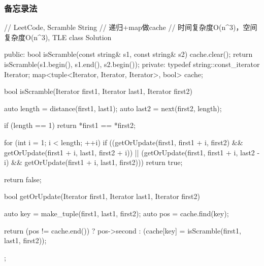 \subsubsection{备忘录法}
\begin{Code}
// LeetCode, Scramble String
// 递归+map做cache
// 时间复杂度O(n^3)，空间复杂度O(n^3), TLE
class Solution {
public:
    bool isScramble(const string& s1, const string& s2) {
        cache.clear();
        return isScramble(s1.begin(), s1.end(), s2.begin());
    }
private:
    typedef string::const_iterator Iterator;
    map<tuple<Iterator, Iterator, Iterator>, bool> cache;

    bool isScramble(Iterator first1, Iterator last1, Iterator first2) {
        auto length = distance(first1, last1);
        auto last2 = next(first2, length);

        if (length == 1) return *first1 == *first2;

        for (int i = 1; i < length; ++i)
            if ((getOrUpdate(first1, first1 + i, first2)
                    && getOrUpdate(first1 + i, last1, first2 + i))
                    || (getOrUpdate(first1, first1 + i, last2 - i)
                            && getOrUpdate(first1 + i, last1, first2)))
                return true;

        return false;
    }

    bool getOrUpdate(Iterator first1, Iterator last1, Iterator first2) {
        auto key = make_tuple(first1, last1, first2);
        auto pos = cache.find(key);

        return (pos != cache.end()) ?
                pos->second : (cache[key] = isScramble(first1, last1, first2));
    }
};
\end{Code}


